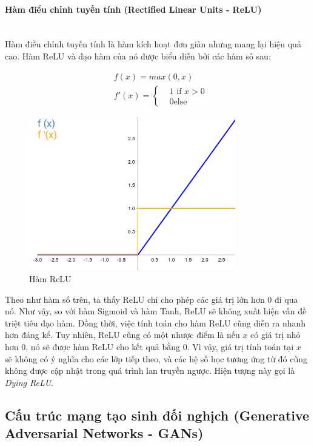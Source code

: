 \paragraph{Hàm điểu chỉnh tuyến tính (Rectified Linear Units - ReLU)}\mbox{}\\

Hàm điều chỉnh tuyến tính là hàm kích hoạt đơn giản nhưng mang lại hiệu quả cao. Hàm ReLU và đạo hàm của nó được biểu diễn bởi các hàm số sau:

\begin{equation}
\begin{split}
    & f(x) = max(0,x)\\
    & f'(x) = 
        \begin{cases}
            & 1 \text{ if } x>0\\
            & 0 \text{else}
        \end{cases}
\end{split}
\end{equation}

\begin{figure}[H]
    \centering
    \includegraphics[width=9cm]{./content/materials/relu.png}
    \caption{Hàm ReLU}
\end{figure}

Theo như hàm số trên, ta thấy ReLU chỉ cho phép các giá trị lớn hơn 0 đi qua nó. Như vậy, so với hàm Sigmoid và hàm Tanh, ReLU sẽ không xuất hiện vấn đề triệt tiêu đạo hàm. Đồng thời, việc tính toán cho hàm ReLU cũng diễn ra nhanh hơn đáng kể. Tuy nhiên, ReLU cũng có một nhược điểm là nếu $x$ có giá trị nhỏ hơn 0, nó sẽ được hàm ReLU cho kết quả bằng 0. Vì vậy, giá trị tính toán tại $x$ sẽ không có ý nghĩa cho các lớp tiếp theo, và các hệ số học tương ứng từ đó cũng không được cập nhật trong quá trình lan truyền ngược. Hiện tượng này gọi là \textit{Dying ReLU}.

\subsection{\texorpdfstring{Cấu trúc mạng tạo sinh đối nghịch (Generative Adversarial Networks - GANs}{gans})}

